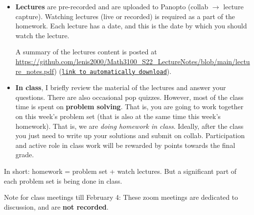\documentclass[oneside,11pt]{amsart}
\begin{document}
\begin{itemize}
	\item \textbf{Lectures} are pre-recorded and are uploaded to Panopto (collab $\to$ lecture capture). 
		Watching lectures (live or recorded) is required as 
		a part of the homework.
		Each lecture has a date, and this is the date by which you should watch the lecture.

		A summary of the lectures content is posted at 
		\url{https://github.com/lenis2000/Math3100_S22_LectureNotes/blob/main/lecture_notes.pdf})
		(\href{https://github.com/lenis2000/Math3100_S22_LectureNotes/raw/main/lecture_notes.pdf}
		{\texttt{link to automatically download}}).

		
	\item \textbf{In class}, I briefly review the material of the lectures
		and answer your 
		questions. There are also occasional pop quizzes.
		However, most of the class time is spent on \textbf{problem solving}.
		That is, you are going to work together 
		on this week's problem set (that is also at the same time this week's homework).
		That is, we are \emph{doing homework in class}.
		Ideally, after the class you just need to write up your solutions 
		and submit on collab. 
		Participation and active role in class work 
		will be rewarded by points towards the final grade.
\end{itemize}

In short: 
homework = problem set + watch lectures. But a significant part of each problem set is being done in class.

\bigskip

Note for class meetings till February 4: These zoom meetings are 
dedicated to discussion, and are \textbf{not recorded}.

%
\end{document}
